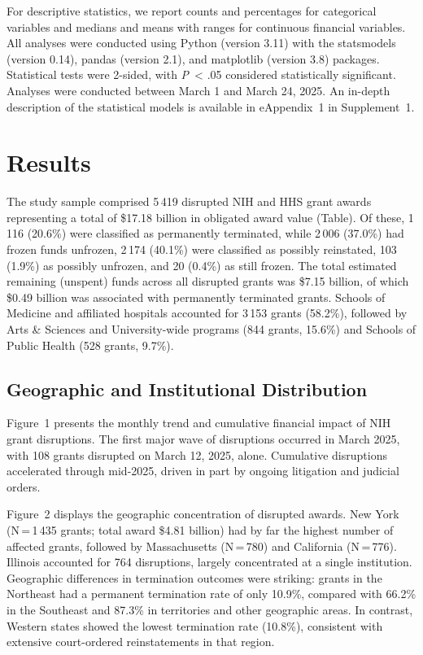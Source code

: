 \documentclass[10pt, letterpaper]{article}
\begin{document}
For descriptive statistics, we report counts and percentages for categorical variables and medians and means with ranges for continuous financial variables. All analyses were conducted using Python (version 3.11) with the statsmodels (version 0.14), pandas (version 2.1), and matplotlib (version 3.8) packages. Statistical tests were 2-sided, with \textit{P}~< .05 considered statistically significant. Analyses were conducted between March 1 and March 24, 2025. An in-depth description of the statistical models is available in eAppendix~1 in Supplement~1.

\section*{Results}

The study sample comprised 5\,419 disrupted NIH and HHS grant awards representing a total of \$17.18 billion in obligated award value (Table). Of these, 1\,116 (20.6\%) were classified as permanently terminated, while 2\,006 (37.0\%) had frozen funds unfrozen, 2\,174 (40.1\%) were classified as possibly reinstated, 103 (1.9\%) as possibly unfrozen, and 20 (0.4\%) as still frozen. The total estimated remaining (unspent) funds across all disrupted grants was \$7.15 billion, of which \$0.49 billion was associated with permanently terminated grants. Schools of Medicine and affiliated hospitals accounted for 3\,153 grants (58.2\%), followed by Arts \& Sciences and University-wide programs (844 grants, 15.6\%) and Schools of Public Health (528 grants, 9.7\%).

\subsection*{Geographic and Institutional Distribution}

Figure~1 presents the monthly trend and cumulative financial impact of NIH grant disruptions. The first major wave of disruptions occurred in March 2025, with 108 grants disrupted on March 12, 2025, alone. Cumulative disruptions accelerated through mid-2025, driven in part by ongoing litigation and judicial orders.

Figure~2 displays the geographic concentration of disrupted awards. New York (N\,=\,1\,435 grants; total award \$4.81 billion) had by far the highest number of affected grants, followed by Massachusetts (N\,=\,780) and California (N\,=\,776). Illinois accounted for 764 disruptions, largely concentrated at a single institution. Geographic differences in termination outcomes were striking: grants in the Northeast had a permanent termination rate of only 10.9\%, compared with 66.2\% in the Southeast and 87.3\% in territories and other geographic areas. In contrast, Western states showed the lowest termination rate (10.8\%), consistent with extensive court-ordered reinstatements in that region.
\end{document}
